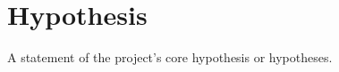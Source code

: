 \section{Hypothesis}
\label{sec:hypothesis}

A statement of the project's core hypothesis or hypotheses.